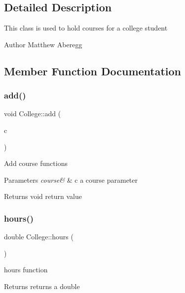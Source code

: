 \subsection{Detailed Description}
This class is used to hold courses for a college student \begin{DoxyAuthor}{Author}
Matthew Aberegg 
\end{DoxyAuthor}


\subsection{Member Function Documentation}
\mbox{\label{class_college_a67fd1d8970b46b24ce2e0dd72598a22f}} 
\subsubsection{\texorpdfstring{add()}{add()}}
{\footnotesize\ttfamily void College\+::add (\begin{DoxyParamCaption}\item[{\mbox{\hyperlink{classcourse}{course}} \&}]{c }\end{DoxyParamCaption})}

Add course functions 
\begin{DoxyParams}{Parameters}
{\em course\&} & c a course parameter \\
\hline
\end{DoxyParams}
\begin{DoxyReturn}{Returns}
void return value 
\end{DoxyReturn}
\mbox{\label{class_college_a8a7a762611a1d7e00c453390d49355fd}} 
\subsubsection{\texorpdfstring{hours()}{hours()}}
{\footnotesize\ttfamily double College\+::hours (\begin{DoxyParamCaption}{ }\end{DoxyParamCaption})}

hours function \begin{DoxyReturn}{Returns}
returns a double 
\end{DoxyReturn}
\mbox{\label{class_college_a4d2ae513b36e6421fb1ca2c08459cfe6}} 
